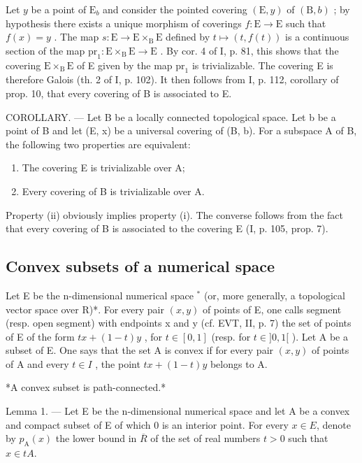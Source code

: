 Let \(y\) be a point of \(\mathrm{E}_b\) and consider the pointed covering \((\mathrm{E},y)\) of \((\mathrm{B},b)\) ; by hypothesis there exists a unique morphism of coverings \(f\colon \mathrm{E}\to \mathrm{E}\) such that \(f(x) = y\) . The map \(s\colon \mathrm{E}\to \mathrm{E}\times_{\mathrm{B}}\mathrm{E}\) defined by \(t\mapsto (t,f(t))\) is a continuous section of the map \(\mathrm{pr}_1\colon \mathrm{E}\times_{\mathrm{B}}\mathrm{E}\to \mathrm{E}\) . By cor. 4 of I, p. 81, this shows that the covering \(\mathrm{E}\times_{\mathrm{B}}\mathrm{E}\) of E given by the map \(\mathrm{pr}_1\) is trivializable. The covering E is therefore Galois (th. 2 of I, p. 102). It then follows from I, p. 112, corollary of prop. 10, that every covering of B is associated to E.

COROLLARY. --- Let B be a locally connected topological space. Let b be a point of B and let (E, x) be a universal covering of (B, b). For a subspace A of B, the following two properties are equivalent:

\begin{enumerate}
\def\labelenumi{(\roman{enumi})}
\item
  The covering E is trivializable over A;
\item
  Every covering of B is trivializable over A.
\end{enumerate}

Property (ii) obviously implies property (i). The converse follows from the fact that every covering of B is associated to the covering E (I, p. 105, prop. 7).

\subsection{Convex subsets of a numerical space}

Let E be the n-dimensional numerical space \(^{*}\) (or, more generally, a topological vector space over R)*. For every pair \((x,y)\) of points of E, one calls segment (resp. open segment) with endpoints x and y (cf. EVT, II, p. 7) the set of points of E of the form \(tx + (1-t)y\) , for \(t \in [0,1]\) (resp. for \(t \in ]0,1[\) ). Let A be a subset of E. One says that the set A is convex if for every pair \((x,y)\) of points of A and every \(t \in I\) , the point \(tx + (1-t)y\) belongs to A.

*A convex subset is path-connected.*

Lemma 1. --- Let E be the n-dimensional numerical space and let A be a convex and compact subset of E of which 0 is an interior point. For every \(x \in E\), denote by \(p_{\mathrm{A}}(x)\) the lower bound in \(\overline{R}\) of the set of real numbers \(t > 0\) such that \(x \in tA\).

